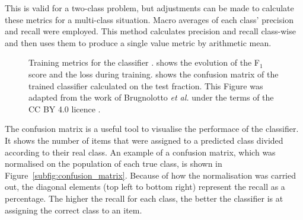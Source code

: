 This is valid for a two-class problem, but adjustments can be made to calculate these metrics for a multi-class situation. Macro averages of each class' precision and recall were employed. This method calculates precision and recall class-wise and then uses them to produce a single value metric by arithmetic mean.

\begin{figure}
    \centering
    \caption[Training metrics for the classifier.]{Training metrics for the classifier \cite{Brugnolotto2024}.  shows the evolution of the F\(_1\) score and the loss during training.  shows the confusion matrix of the trained classifier calculated on the test fraction. This Figure was adapted from the work of Brugnolotto \textit{et al.} \cite{Brugnolotto2024} under the terms of the CC BY 4.0 licence \cite{CCBY40}.}
    \label{fig:training_metrics}
\end{figure}

The confusion matrix is a useful tool to visualise the performace of the classifier. It shows the number of items that were assigned to a predicted class divided according to their real class. An example of a confusion matrix, which was normalised on the population of each true class, is shown in Figure~\ref{subfig:confusion_matrix}. Because of how the normalisation was carried out, the diagonal elements (top left to bottom right) represent the recall as a percentage. The higher the recall for each class, the better the classifier is at assigning the correct class to an item. 

